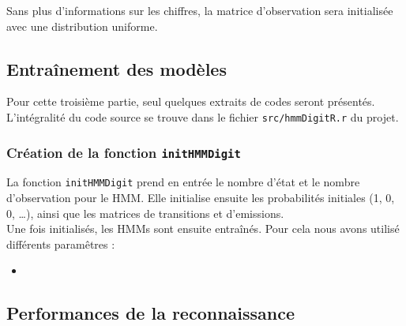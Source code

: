 Sans plus d'informations sur les chiffres, la matrice d'observation sera initialisée avec une distribution uniforme.


\subsection{Entraînement des modèles}

Pour cette troisième partie, seul quelques extraits de codes seront présentés. L'intégralité du code source se trouve dans le fichier \texttt{src/hmmDigitR.r} du projet. 

\subsubsection*{Création de la fonction \texttt{initHMMDigit}}
La fonction \texttt{initHMMDigit} prend en entrée le nombre d'état et le nombre d'observation pour le HMM. Elle initialise ensuite les probabilités initiales (1, 0, 0, \dots), ainsi que les matrices de transitions et d'emissions.\\

Une fois initialisés, les HMMs sont ensuite entraînés. Pour cela nous avons utilisé différents paramêtres :
\begin{itemize}
	\item
\end{itemize}

\subsection{Performances de la reconnaissance}
